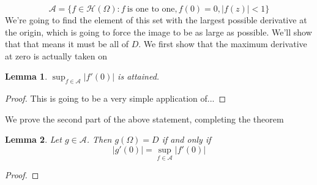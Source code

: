 \documentclass{article}
\newtheorem{lemma}{Lemma}
\newcommand{\mc}[1]{\mathcal{#1}}
\begin{document}
\[\mc{A} = \{f \in \mc{H}(\Omega) : f \ \text{is one to one}, f(0) = 0, |f(z)| < 1\}\]
We're going to find the element of this set with the largest possible derivative at the origin, which is going to force the image to be as large as possible. We'll show that that means it must be all of \(D\).
We first show that the maximum derivative at zero is actually taken on
\begin{lemma}
\(\sup_{f \in \mc{A}}|f'(0)|\) is attained.
\end{lemma}
\begin{proof}
This is going to be a very simple application of...
\end{proof}
We prove the second part of the above statement, completing the theorem
\begin{lemma}
Let \(g \in \mc{A}\). Then \(g(\Omega) = D\) if and only if
\[|g'(0)| = \sup_{f \in \mc{A}}|f'(0)|\]
\end{lemma}
\begin{proof}

\end{proof}
\end{document}
